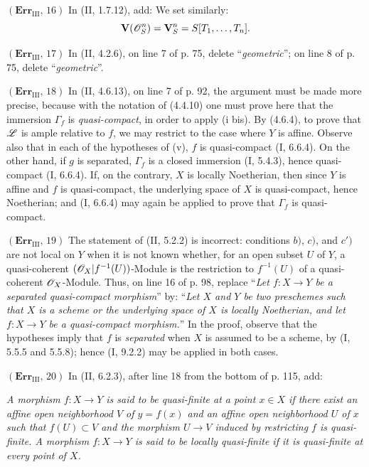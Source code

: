 \noindent\textbf{$(\mathbf{Err}_{\mathrm{III}},\,16)$} In (II, 1.7.12), add:
We set similarly:
\[
  \mathbf V(\mathscr{O}_S^n)=\mathbf V_S^n=S[T_1,\ldots,T_n].
\]

\noindent\textbf{$(\mathbf{Err}_{\mathrm{III}},\,17)$} In (II, 4.2.6), on
line 7 of p. 75, delete ``\emph{geometric}''; on line 8 of p. 75, delete
``\emph{geometric}''.

\noindent\textbf{$(\mathbf{Err}_{\mathrm{III}},\,18)$} In (II, 4.6.13), on
line 7 of p. 92, the argument must be made more precise, because with the
notation of (4.4.10) one must prove here that the immersion $\Gamma_f$ is
\emph{quasi-compact}, in order to apply (i bis). By (4.6.4), to prove that
$\mathscr{L}$ is ample relative to $f$, we may restrict to the case where $Y$ is
affine. Observe also that in each of the hypotheses of (v), $f$ is
quasi-compact (I, 6.6.4). On the other hand, if $g$ is
separated, $\Gamma_f$ is a closed immersion (I, 5.4.3), hence quasi-compact
(I, 6.6.4). If, on the contrary, $X$ is locally Noetherian, then since $Y$ is
affine and $f$ is quasi-compact, the underlying space of $X$ is quasi-compact,
hence Noetherian; and (I, 6.6.4) may again be applied to prove that $\Gamma_f$
is quasi-compact.

\noindent\textbf{$(\mathbf{Err}_{\mathrm{III}},\,19)$} The statement of (II,
5.2.2) is incorrect: conditions $b)$, $c)$, and $c')$ are not local on $Y$
when it is not known whether, for an open subset $U$ of $Y$, a quasi-coherent
$(\mathscr{O}_X|f^{-1}(U))$-Module is the restriction to $f^{-1}(U)$ of a
quasi-coherent $\mathscr{O}_X$-Module. Thus, on line 16 of p. 98, replace
``\emph{Let $f:X\to Y$ be a separated quasi-compact morphism}'' by:
``\emph{Let $X$ and $Y$ be two preschemes such that $X$ is a scheme or the
underlying space of $X$ is locally Noetherian, and let $f:X\to Y$ be a
quasi-compact morphism.}'' In the proof, observe that the hypotheses imply
that $f$ is \emph{separated} when $X$ is assumed to be a scheme, by (I, 5.5.5
and 5.5.8); hence (I, 9.2.2) may be applied in both cases.

\noindent\textbf{$(\mathbf{Err}_{\mathrm{III}},\,20)$} In (II, 6.2.3), after
line 18 from the bottom of p. 115, add:

\emph{A morphism $f:X\to Y$ is said to be quasi-finite at a point $x\in X$ if
there exist an affine open neighborhood $V$ of $y=f(x)$ and an affine open
neighborhood $U$ of $x$ such that $f(U)\subset V$ and the morphism $U\to V$
induced by restricting $f$ is quasi-finite. A morphism $f:X\to Y$ is said to
be locally quasi-finite if it is quasi-finite at every point of $X$.}

